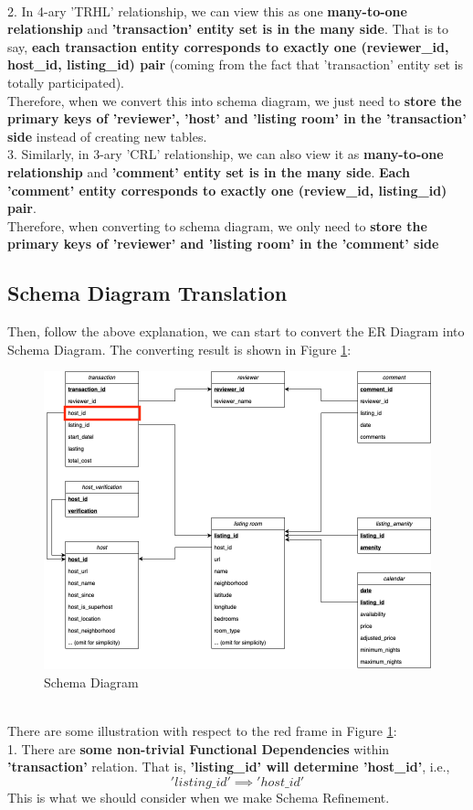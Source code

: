 \documentclass{article}
\begin{document}
	\vspace{3pt}
	\\
	2. In 4-ary 'TRHL' relationship, we can view this as one \textbf{many-to-one relationship} and \textbf{'transaction' entity set is in the many side}. That is to say, \textbf{each transaction entity corresponds to exactly one (reviewer\_id, host\_id, listing\_id) pair} (coming from the fact that 'transaction' entity set is totally participated).
	\\
	Therefore, when we convert this into schema diagram, we just need to \textbf{store the primary keys of 'reviewer', 'host' and 'listing room' in the 'transaction' side} instead of creating new tables.
	\vspace{3pt}
	\\
	3. Similarly, in 3-ary 'CRL' relationship, we can also view it as \textbf{many-to-one relationship} and \textbf{'comment' entity set is in the many side}. \textbf{Each 'comment' entity corresponds to exactly one (review\_id, listing\_id) pair}.
	\\
	Therefore, when converting to schema diagram, we only need to \textbf{store the primary keys of 'reviewer' and 'listing room' in the 'comment' side}
	\subsection{Schema Diagram Translation}
	Then, follow the above explanation, we can start to convert the ER Diagram into Schema Diagram. The converting result is shown in Figure \ref{fig:012}:
	\begin{figure}[h]
		\centering
		\includegraphics[width=.5\textheight]{sd.png}
		\caption{Schema Diagram}
		\label{fig:012}
	\end{figure}
	\vspace{3pt}
	\\
	There are some illustration with respect to the red frame in Figure \ref{fig:012}:
	\vspace{3pt}
	\\
	1. There are \textbf{some non-trivial Functional Dependencies} within \textbf{'transaction' }relation. That is, \textbf{'listing\_id' will determine 'host\_id'}, i.e., 
	$$
	'listing\_id' \implies 'host\_id'
	$$
	This is what we should consider when we make Schema Refinement.
\end{document}
